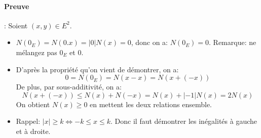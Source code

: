 \documentclass{article}
\begin{document}
\paragraph{Preuve}: Soient $(x, y) \in E^2$.
\begin{itemize}
 \item $N(0_{E}) = N(0.x) = |0| N(x) = 0$, donc on a: \underline{$N(0_E) = 0$}.
          \newline Remarque: ne mélangez pas $0_E$ et $0$.
 \item D'après la propriété qu'on vient de démontrer, on a:
          \[
          0 = N(0_{E}) = N(x-x) = N(x+(-x)) 
          \]
          De plus, par sous-additivité, on a: 
          \[
          N(x+(-x)) \leq N(x) + N(-x) = N(x) + |-1|N(x) = 2N(x)
          \]
          On obtient \underline{$N(x) \geq 0$} en mettent les deux relations ensemble.
 \item Rappel: $|x| \geq k \Longleftrightarrow -k \leq x \leq k$. 
          \newline Donc il faut démontrer les inégalités à gauche et à droite.
 
 
\end{itemize}
\end{document}
